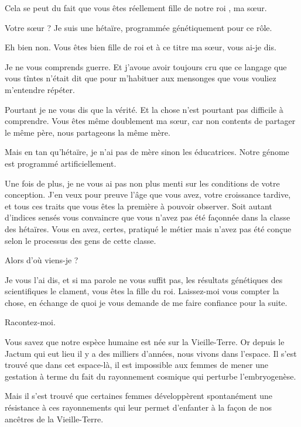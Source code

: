 \begin{drama}
   \elenaspeaks Cela se peut du fait que vous êtes réellement fille de notre roi \roi, ma sœur.

   \elaspeaks Votre sœur ? Je suis une hétaïre, programmée génétiquement pour ce rôle.

   \elenaspeaks Eh bien non. Vous êtes bien fille de roi et à ce titre ma sœur, vous ai-je dis.

   \elaspeaks Je ne vous comprends guerre. Et j’avoue avoir toujours cru que ce langage que vous tîntes n’était dit que pour m’habituer aux mensonges que vous vouliez m’entendre répéter.


   \elenaspeaks Pourtant je ne vous dis que la vérité. Et la chose n’est pourtant pas difficile à comprendre. Vous êtes même doublement ma sœur, car non contents de partager le même père, nous partageons la même mère.

   \elaspeaks Mais en tan qu’hétaïre, je n’ai pas de mère sinon les éducatrices. Notre génome est programmé artificiellement.

   \elenaspeaks Une fois de plus, je ne vous ai pas non plus menti sur les conditions de votre conception. J’en veux pour preuve l’âge que vous avez, votre croissance tardive, et tous ces traits que vous êtes la première à pouvoir observer. Soit autant d’indices sensés vous convaincre que vous n’avez pas été façonnée dans la classe des hétaïres. Vous en avez, certes, pratiqué le métier mais n’avez pas été conçue selon le processus des gens de cette classe.

   \elaspeaks Alors d’où viens-je ?

   \elenaspeaks Je vous l’ai dis, et si ma parole ne vous suffit pas, les résultats génétiques des scientifiques le clament, vous êtes la fille du roi. Laissez-moi vous compter la chose, en échange de quoi je vous demande de me faire confiance pour la suite.

   \elaspeaks Racontez-moi.

   \elenaspeaks Vous savez que notre espèce humaine est née sur la Vieille-Terre. Or depuis le Jactum qui eut lieu il y a des milliers d’années, nous vivons dans l’espace. Il s’est trouvé que dans cet espace-là, il est impossible aux femmes de mener une gestation à terme du fait du rayonnement cosmique qui perturbe l’embryogenèse.

   Mais il s’est trouvé que certaines femmes développèrent spontanément une résistance à ces rayonnements qui leur permet d’enfanter à la façon de nos ancêtres de la Vieille-Terre.


\end{drama}
